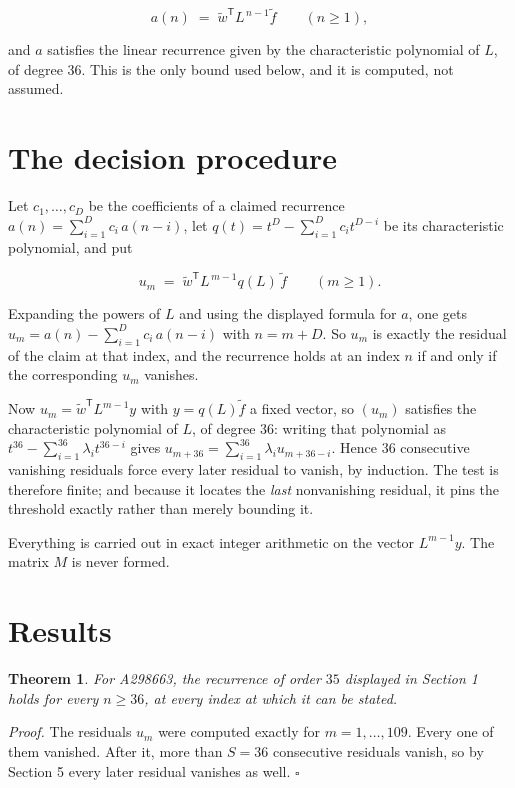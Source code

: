 \documentclass[11pt]{article}
\newtheorem{theorem}{Theorem}
\theoremstyle{definition}
\begin{document}
\[a(n) \;=\; \tilde w^{\mathsf T} L^{\,n-1} \tilde f \qquad (n \ge 1),\]

and $a$ satisfies the linear recurrence given by the characteristic polynomial of $L$, of degree $36$. This is the only bound used below, and it is computed, not assumed.

\section{The decision procedure}

Let $c_1,\dots,c_D$ be the coefficients of a claimed recurrence $a(n) = \sum_{i=1}^{D} c_i\,a(n-i)$, let $q(t) = t^{D} - \sum_{i=1}^{D} c_i t^{D-i}$ be its characteristic polynomial, and put

\[u_m \;=\; \tilde w^{\mathsf T} L^{\,m-1} q(L)\,\tilde f \qquad (m \ge 1).\]

Expanding the powers of $L$ and using the displayed formula for $a$, one gets $u_m = a(n) - \sum_{i=1}^{D} c_i\,a(n-i)$ with $n = m + D$. So $u_m$ is exactly the residual of the claim at that index, and the recurrence holds at an index $n$ if and only if the corresponding $u_m$ vanishes.

Now $u_m = \tilde w^{\mathsf T} L^{m-1} y$ with $y = q(L)\tilde f$ a fixed vector, so $(u_m)$ satisfies the characteristic polynomial of $L$, of degree $36$: writing that polynomial as $t^{36} - \sum_{i=1}^{36} \lambda_i t^{36-i}$ gives $u_{m+36} = \sum_{i=1}^{36} \lambda_i u_{m+36-i}$. Hence $36$ consecutive vanishing residuals force every later residual to vanish, by induction. The test is therefore finite; and because it locates the {\itshape last} nonvanishing residual, it pins the threshold exactly rather than merely bounding it.

Everything is carried out in exact integer arithmetic on the vector $L^{m-1}y$. The matrix $M$ is never formed.

\section{Results}

\begin{theorem} For A298663, the recurrence of order $35$ displayed in Section 1 holds for every $n \ge 36$, at every index at which it can be stated.\end{theorem}

{\itshape Proof.} The residuals $u_m$ were computed exactly for $m = 1,\dots,109$. Every one of them vanished. After it, more than $S = 36$ consecutive residuals vanish, so by Section 5 every later residual vanishes as well. $\square$
\end{document}

